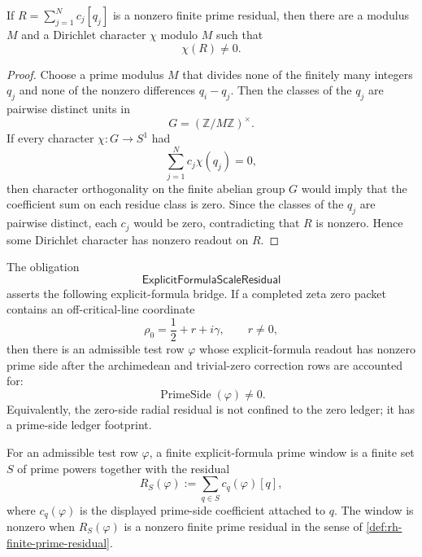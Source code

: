 \begin{theorem}
\label{thm:rh-finite-dirichlet-classifiers-separate-residuals}
If $R=\sum_{j=1}^{N}c_j[q_j]$ is a nonzero finite prime residual, then
there are a modulus $M$ and a Dirichlet character $\chi$ modulo $M$ such
that
$$
\chi(R)\ne0.
$$
\end{theorem}

\begin{proof}
Choose a prime modulus $M$ that divides none of the finitely many
integers $q_j$ and none of the nonzero differences $q_i-q_j$.  Then the
classes of the $q_j$ are pairwise distinct units in
$$
G=(\mathbb Z/M\mathbb Z)^{\times}.
$$
If every character $\chi:G\to S^1$ had
$$
\sum_{j=1}^{N}c_j\chi(q_j)=0,
$$
then character orthogonality on the finite abelian group $G$ would imply
that the coefficient sum on each residue class is zero.  Since the
classes of the $q_j$ are pairwise distinct, each $c_j$ would be zero,
contradicting that $R$ is nonzero.  Hence some Dirichlet character has
nonzero readout on $R$.
\end{proof}

\begin{definition}[ExplicitFormulaScaleResidual]
\label{def:rh-explicit-formula-scale-residual}
The obligation
$$
\mathsf{ExplicitFormulaScaleResidual}
$$
asserts the following explicit-formula bridge.  If a completed zeta zero
packet contains an off-critical-line coordinate
$$
\rho_0=\frac12+r+i\gamma,
\qquad
r\ne0,
$$
then there is an admissible test row $\varphi$ whose explicit-formula
readout has nonzero prime side after the archimedean and trivial-zero
correction rows are accounted for:
$$
\operatorname{PrimeSide}(\varphi)\ne0.
$$
Equivalently, the zero-side radial residual is not confined to the
zero ledger; it has a prime-side ledger footprint.
\end{definition}

\begin{definition}
\label{def:rh-finite-explicit-formula-prime-window}
For an admissible test row $\varphi$, a finite explicit-formula prime
window is a finite set $S$ of prime powers together with the residual
$$
R_S(\varphi):=\sum_{q\in S}c_q(\varphi)[q],
$$
where $c_q(\varphi)$ is the displayed prime-side coefficient attached to
$q$.  The window is nonzero when $R_S(\varphi)$ is a nonzero finite prime
residual in the sense of \autoref{def:rh-finite-prime-residual}.
\end{definition}

